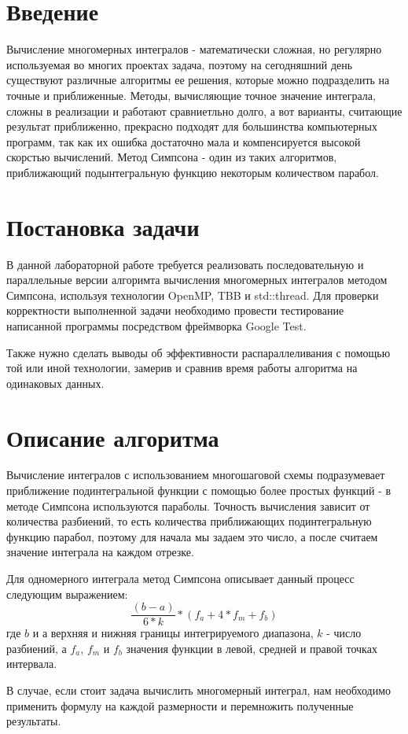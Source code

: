 \documentclass{report}
\begin{document}
\setcounter{page}{2}

\tableofcontents
\newpage

\section*{Введение}
\par Вычисление многомерных интегралов - математически сложная, но регулярно используемая во многих проектах задача, поэтому на сегодняшний день существуют различные алгоритмы ее решения, которые можно подразделить на точные и приближенные. Методы, вычисляющие точное значение интеграла, сложны в реализации и работают сравниетльно долго, а вот варианты, считающие результат приближенно, прекрасно подходят для большинства компьютерных программ, так как их ошибка достаточно мала и компенсируется высокой скорстью вычислений. Метод Симпсона - один из таких алгоритмов, приближающий подынтегральную функцию некоторым количеством парабол.
\newpage

\section*{Постановка задачи}
\par В данной лабораторной работе требуется реализовать последовательную и параллельные версии алгоримта вычисления многомерных интегралов методом Симпсона, используя технологии OpenMP, TBB и std::thread. Для проверки корректности выполненной задачи необходимо провести тестирование написанной программы посредством фреймворка Google Test. 
\par Также нужно сделать выводы об эффективности распараллеливания с помощью той или иной технологии, замерив и сравнив время работы алгоритма на одинаковых данных.
\newpage

\section*{Описание алгоритма}
\par Вычисление интегралов с использованием многошаговой схемы подразумевает приближение подинтегральной функции с помощью более простых функций - в методе Симпсона используются параболы. Точность вычисления зависит от количества разбиений, то есть количества приближающих подинтегральную функцию парабол, поэтому для начала мы задаем это число, а после считаем значение интеграла на каждом отрезке. 
\par Для одномерного интеграла метод Симпсона описывает данный процесс следующим выражением: $$ \frac{(b - a)} {6 * k} * (f_{a} + 4 * f_{m} + f_{b})$$где $b$ и $а$ верхняя и нижняя границы интегрируемого диапазона, $k$ - число разбиений, а $f_{a}$, $f_{m}$ и $f_b$ значения функции в левой, средней и правой точках интервала.
\par В случае, если стоит задача вычислить многомерный интеграл, нам необходимо применить формулу на каждой размерности и перемножить полученные результаты. 
\newpage
\end{document}
